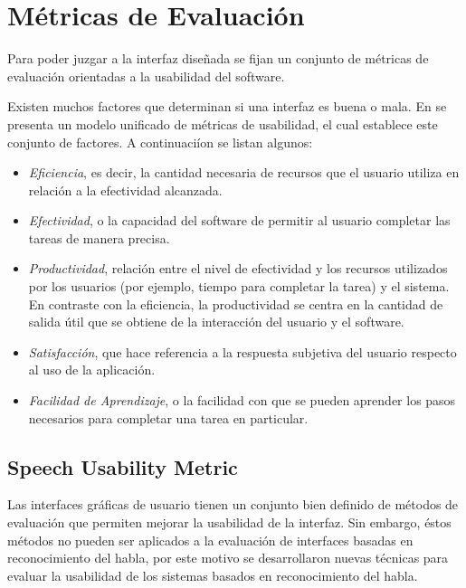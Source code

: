 \section{M\'etricas de Evaluaci\'on}
\label{sec:metricas}

Para poder juzgar a la interfaz dise\~nada se fijan un conjunto de m\'etricas
de evaluaci\'on orientadas a la usabilidad del software.

Existen muchos factores que determinan si una interfaz es buena o mala. En \cite{AhmedUsability2006} 
se presenta un modelo unificado de m\'etricas de usabilidad, el cual establece este conjunto de factores.
A continuaci\'ion se listan algunos:

\begin{itemize}
    \item \emph{Eficiencia}, es decir, la cantidad necesaria de recursos que el usuario utiliza
	en relaci\'on a la efectividad alcanzada.
    \item \emph{Efectividad}, o la capacidad del software de permitir al usuario completar las tareas
	de manera precisa.
    \item \emph{Productividad}, relaci\'on entre el nivel de efectividad y los recursos utilizados por los
	usuarios (por ejemplo, tiempo para completar la tarea) y el sistema. En contraste con la eficiencia,
	la productividad se centra en la cantidad de salida \'util que se obtiene de la interacci\'on del
	usuario y el software.
     \item \emph{Satisfacci\'on}, que hace referencia a la respuesta subjetiva del usuario respecto al uso de la
	aplicaci\'on.
    \item \emph{Facilidad de Aprendizaje}, o la facilidad con que se pueden aprender los pasos necesarios
	para completar una tarea en particular.
\end{itemize}

\subsection{Speech Usability Metric}

Las interfaces gr\'aficas de usuario tienen un conjunto bien definido de m\'etodos de evaluaci\'on que permiten mejorar
la usabilidad de la interfaz. Sin embargo, \'estos m\'etodos no pueden ser aplicados a la evaluaci\'on de interfaces
basadas en reconocimiento del habla, por este motivo se desarrollaron nuevas t\'ecnicas para evaluar la usabilidad de 
los sistemas basados en reconocimiento del habla.

